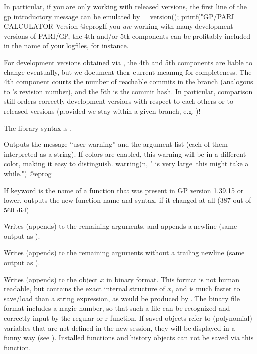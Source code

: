 In particular, if you are only working with released versions, the first
line of the gp introductory message can be emulated by
\bprog
   [M,m,p] = version();
   printf("GP/PARI CALCULATOR Version %
 @eprog\noindent If you \emph{are} working with many development versions of
 PARI/GP, the 4th and/or 5th components can be profitably included in the
 name of your logfiles, for instance.

  For development versions obtained via ,
 the 4th and 5th components are liable to change eventually, but we document
 their current meaning for completeness. The 4th component counts the number
 of reachable commits in the branch (analogous to 's revision
 number), and the 5th is the  commit hash. In particular, 
 comparison still orders correctly development versions with respect to each
 others or to released versions (provided we stay within a given branch,
 e.g. )!

The library syntax is .

\label{se:warning}
Outputs the message ``user warning''
and the argument list (each of them interpreted as a string).
If colors are enabled, this warning will be in a different color,
making it easy to distinguish.
\bprog
warning(n, " is very large, this might take a while.")
@eprog

\label{se:whatnow}
If keyword  is the name of a function that was present in GP
version 1.39.15 or lower, outputs the new function name and syntax, if it
changed at all ($387$ out of $560$ did).

\label{se:write}
Writes (appends) to  the remaining arguments, and appends a
newline (same output as ).

\label{se:write1}
Writes (appends) to  the remaining arguments without a
trailing newline (same output as ).

\label{se:writebin}
Writes (appends) to
 the object $x$ in binary format. This format is not human
readable, but contains the exact internal structure of $x$, and is much
faster to save/load than a string expression, as would be produced by
. The binary file format includes a magic number, so that such a
file can be recognized and correctly input by the regular  or \b{r}
function. If saved objects refer to (polynomial) variables that are not
defined in the new session, they will be displayed in a funny way (see
). Installed functions and history objects can not be saved
via this function.

